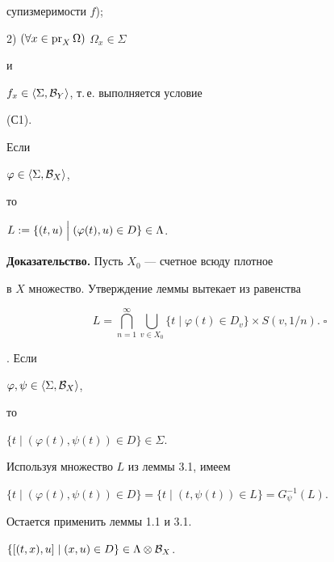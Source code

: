 супизмеримости $f$);


2) $(\forall x\in\operatorname{pr}_X\Omega)$ \; $\Omega_x\in\Sigma$


и


$f_x\in\langle \Sigma,{\cal B}_Y\rangle $, т.\,е. выполняется условие


(С1).





\begin{lems} Если


$\varphi\in\langle \Sigma,{\cal B}_X\rangle $,


то


$L:=\{(t,u)\Bigm |(\varphi(t),u)\in D\}\in\Lambda$.


\end{lems}





{\bf Доказательство.} Пусть $X_0$ --- счетное всюду плотное


в $X$ множество. Утверждение леммы вытекает из равенства


$$


L=\bigcap\limits_{n=1}^\infty\bigcup\limits_{v\in X_0}


\{t\mid \varphi(t)\in D_v\}\times S(v,1/n).\; \square


$$





\begin{cors} \cite{Sh5}. Если


$\varphi,\psi\in\langle \Sigma,{\cal B}_X\rangle $,


то


$\{t\mid (\varphi(t),\psi(t))\in D\}\in\Sigma$.


\end{cors}





\begin{pf} Используя множество $L$ из леммы 3.1, имеем


$\{t\mid (\varphi(t),\psi(t))\in D\}=\{t\mid (t,\psi(t))\in L\}=G_\psi^{-1}(L)$.


Остается применить леммы 1.1 и 3.1.


\end{pf}





\begin{lems} $\{[(t,x),u]\mid (x,u)\in D\}\in\Lambda\otimes{\cal B}_X$.


\end{lems}





